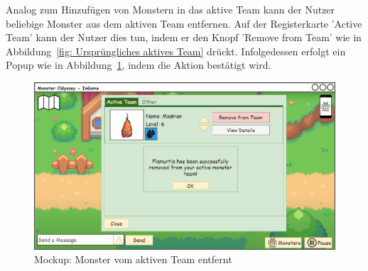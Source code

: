 Analog zum Hinzufügen von Monstern in das aktive Team kann der Nutzer beliebige Monster aus dem aktiven Team entfernen. 
Auf der Registerkarte 'Active Team' kann der Nutzer dies tun, indem er den Knopf 'Remove from Team' wie in Abbildung~\ref{fig: Ursprüngliches aktives Team} drückt. Infolgedessen erfolgt ein Popup wie in Abbildung~\ref{fig: Monster vom aktiven Team entfernt}, indem die Aktion bestätigt wird. 
\begin{figure}[H]
    \center
    \includegraphics[scale=\scale]{images/mockups/Monster/IngameMonsterMonsterActiveRemoved.png}
    \caption{Mockup: Monster vom aktiven Team entfernt}
    \label{fig: Monster vom aktiven Team entfernt}
\end{figure}
